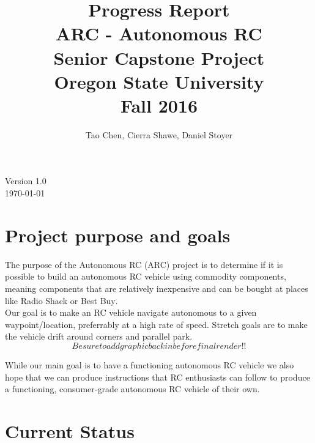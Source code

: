 \documentclass[compsoc,draftclsnofoot,onecolumn,10pt]{IEEEtran}
\date{}
\begin{document}
\begin{titlepage}
\title{
Progress Report\\
\LARGE
ARC - Autonomous RC\\
Senior Capstone Project\\
Oregon State University\\
Fall 2016
}
\author{Tao Chen, Cierra Shawe, Daniel Stoyer}
\maketitle
\begin{center}
	Version 1.0\\
	\today
\end{center}

\thispagestyle{empty} %
	
\end{titlepage}

\tableofcontents

\newpage

\section{Project purpose and goals} 
The purpose of the Autonomous RC (ARC) project is to determine if it is possible
to build an autonomous RC vehicle using commodity components, meaning components
that are relatively inexpensive and can be bought at places like Radio
Shack\textsuperscript{\textregistered} or Best
Buy\textsuperscript{\textregistered}. \\
Our goal is to make an RC vehicle navigate autonomous to a given
waypoint/location, preferrably at a high rate of speed. Stretch goals are to
make the vehicle drift around corners and parallel park.\\

\[Be sure to add graphic back in before final render!!\]

While our main goal is to have a functioning autonomous RC vehicle we also hope
that we can produce instructions that RC enthusiasts can follow to produce a
functioning, consumer-grade autonomous RC vehicle of their own.

\section{Current Status}
\end{document}
